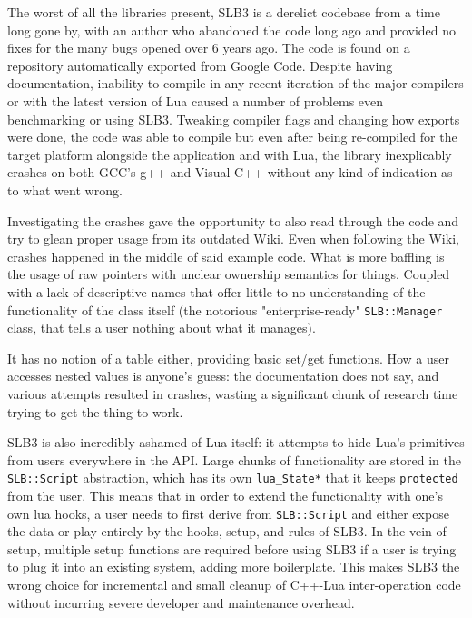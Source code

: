 \documentclass[conference,compsoc]{IEEEtran}
\begin{document}
The worst of all the libraries present, SLB3\cite{slb3} is a derelict codebase from a time long gone by, with an author who abandoned the code long ago and provided no fixes for the many bugs opened over 6 years ago. The code is found on a repository automatically exported from Google Code. Despite having documentation, inability to compile in any recent iteration of the major compilers or with the latest version of Lua caused a number of problems even benchmarking or using SLB3. Tweaking compiler flags and changing how exports were done, the code was able to compile but even after being re-compiled for the target platform alongside the application and with Lua, the library inexplicably crashes on both GCC's g++ and Visual C++ without any kind of indication as to what went wrong.

Investigating the crashes gave the opportunity to also read through the code and try to glean proper usage from its outdated Wiki. Even when following the Wiki, crashes happened in the middle of said example code. What is more baffling is the usage of raw pointers with unclear ownership semantics for things. Coupled with a lack of descriptive names that offer little to no understanding of the functionality of the class itself (the notorious "enterprise-ready" \lstinline|SLB::Manager| class, that tells a user nothing about what it manages).

It has no notion of a table either, providing basic set/get functions. How a user accesses nested values is anyone's guess: the documentation does not say, and various attempts resulted in crashes, wasting a significant chunk of research time trying to get the thing to work.

SLB3 is also incredibly ashamed of Lua itself: it attempts to hide Lua's primitives from users everywhere in the API. Large chunks of functionality are stored in the \lstinline|SLB::Script| abstraction, which has its own \lstinline|lua_State*| that it keeps \lstinline|protected| from the user. This means that in order to extend the functionality with one's own lua hooks, a user needs to first derive from \lstinline|SLB::Script| and either expose the data or play entirely by the hooks, setup, and rules of SLB3. In the vein of setup, multiple setup functions are required before using SLB3 if a user is trying to plug it into an existing system, adding more boilerplate. This makes SLB3 the wrong choice for incremental and small cleanup of C++-Lua inter-operation code without incurring severe developer and maintenance overhead.
\end{document}
